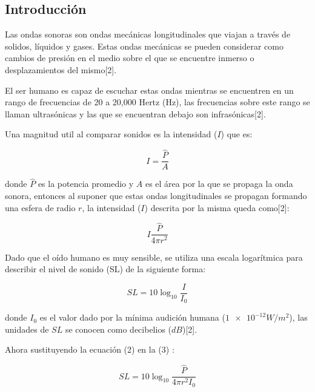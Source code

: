 \documentclass[DIV=calc, paper=a4, fontsize=11pt]{scrartcl}
\begin{document}
\begin{multicols}{2}




\section*{Introducción}

Las ondas sonoras son ondas mecánicas longitudinales que viajan a través de solidos, líquidos y gases. Estas ondas mecánicas se pueden considerar como cambios de presión en el medio sobre el que se encuentre inmerso o desplazamientos del mismo[2].

El ser humano es capaz de escuchar estas ondas mientras se encuentren en un rango de frecuencias de 20 a 20,000 Hertz (Hz), las frecuencias sobre este rango se llaman ultrasónicas y las que se encuentran debajo son infrasónicas[2].



Una magnitud util al comparar sonidos es la intensidad ($I$) que es:

\begin{equation}
    I = \frac{\hat{P}}{A}
\end{equation}

\noindent donde $\hat{P}$ es la potencia promedio y $A$ es el área por la que se propaga la onda sonora, entonces al suponer que estas ondas longitudinales se propagan formando una esfera de radio $r$, la intensidad ($I$) descrita por la misma queda como[2]:

\begin{equation}
    I \frac{\hat{P}}{4 \pi r^2}
\end{equation}

Dado que el oído humano es muy sensible, se utiliza una escala logarítmica para describir el nivel de sonido (SL) de la siguiente forma:

\begin{equation}
    SL = 10 \log_{10}{\frac{I}{I_0}}
\end{equation}

\noindent donde $I_0$ es el valor dado por la mínima audición humana ($\num{1e-12}W/m^2$), las unidades de $SL$ se conocen como decibelios ($dB$)[2].

Ahora sustituyendo la ecuación (2) en la (3) :

\begin{equation*}
    SL = 10 \log_{10}{\frac{\hat{P}}{4 \pi r^2 I_0}}
\end{equation*}


\end{multicols}
\end{document}
